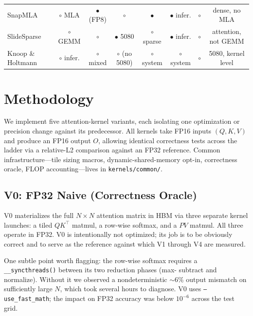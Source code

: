 \documentclass[conference]{IEEEtran}
\begin{document}
\begin{table}[t]
\begin{tabular}{lccccccc}
    SnapMLA~\cite{zhang2026snapmla}                    & $\circ$ MLA & $\bullet$ (FP8) & $\circ$         & $\bullet$            & $\bullet$ infer. & $\circ$ & dense, no MLA \\
    SlideSparse~\cite{shao2026slidesparse}             & $\circ$ GEMM & $\circ$        & $\bullet$ 5080  & $\circ$ sparse       & $\bullet$ infer. & $\circ$ & attention, not GEMM \\
    Knoop \& Holtmann~\cite{knoop2026consumerllm}      & $\circ$ infer. & $\circ$ mixed & $\circ$ (no 5080) & $\circ$ system    & $\circ$ system  & $\circ$ & 5080, kernel level \\
    \bottomrule
  \end{tabular}
\end{table}

\section{Methodology}
\label{sec:method}

We implement five attention-kernel variants, each isolating one
optimization or precision change against its predecessor. All kernels
take FP16 inputs $(Q, K, V)$ and produce an FP16 output $O$, allowing
identical correctness tests across the ladder via a relative-L2
comparison against an FP32 reference. Common infrastructure---tile
sizing macros, dynamic-shared-memory opt-in, correctness oracle, FLOP
accounting---lives in \texttt{kernels/common/}.

\subsection{V0: FP32 Naive (Correctness Oracle)}

V0 materializes the full $N \times N$ attention matrix in HBM via
three separate kernel launches: a tiled $QK^\top$ matmul, a row-wise
softmax, and a $PV$ matmul. All three operate in FP32. V0 is
intentionally not optimized; its job is to be obviously correct and
to serve as the reference against which V1 through V4 are measured.

One subtle point worth flagging: the row-wise softmax requires a
\texttt{\_\_syncthreads()} between its two reduction phases (max-
subtract and normalize). Without it we observed a nondeterministic
$\sim 6\%$ output mismatch on sufficiently large $N$, which took
several hours to diagnose. V0 uses \texttt{--use\_fast\_math};
the impact on FP32 accuracy was below $10^{-6}$ across the test grid.
\end{document}
